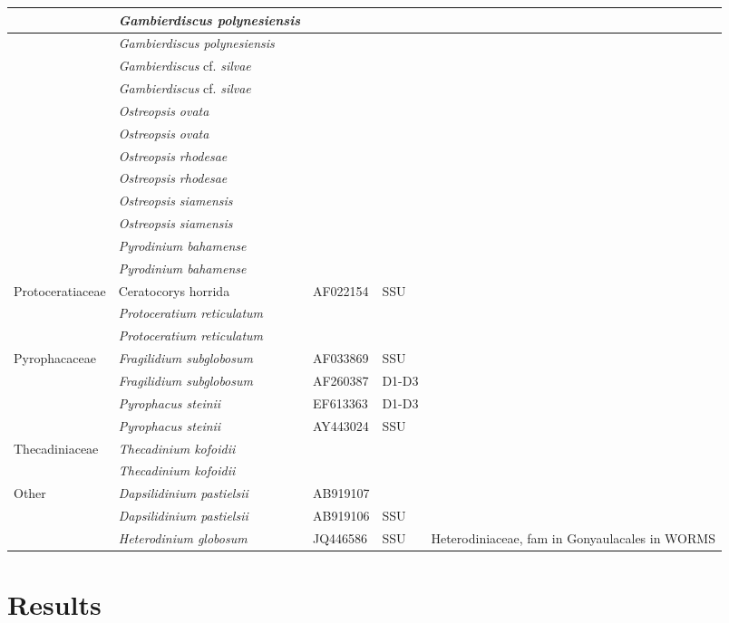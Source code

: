 \documentclass[12pt]{article}
\begin{document}
\begin{table}
\begin{tabular}{  | p{3cm} |p{4cm} | p{2cm} | p{3cm} | p{3cm}  |}
&\emph{Gambierdiscus polynesiensis}&&&\\
\hline
&\emph{Gambierdiscus polynesiensis}&&&\\
\hline
&\emph{Gambierdiscus} cf. \emph{silvae}&&&\\
\hline
&\emph{Gambierdiscus} cf. \emph{silvae}&&&\\
\hline
&\emph{Ostreopsis ovata}&&&\\
\hline
&\emph{Ostreopsis ovata}&&&\\
\hline
&\emph{Ostreopsis rhodesae}&&&\\
\hline
&\emph{Ostreopsis rhodesae}&&&\\
\hline
&\emph{Ostreopsis siamensis}&&&\\
\hline
&\emph{Ostreopsis siamensis}&&&\\
\hline
&\emph{Pyrodinium bahamense}&&&\\
\hline
&\emph{Pyrodinium bahamense}&&&\\
\hline
Protoceratiaceae&Ceratocorys horrida&AF022154&SSU&\\
\hline
&\emph{Protoceratium reticulatum}&&&\\
\hline
&\emph{Protoceratium reticulatum}&&&\\
\hline
Pyrophacaceae&\textit{Fragilidium subglobosum}&AF033869&SSU&\\
\hline
&\textit{Fragilidium subglobosum}&AF260387&D1-D3&\\
\hline
&\textit{Pyrophacus steinii}&EF613363&D1-D3&\\
\hline
&\textit{Pyrophacus steinii}&AY443024&SSU&\\
\hline
Thecadiniaceae&\emph{Thecadinium kofoidii}&&&\\
\hline
&\emph{Thecadinium kofoidii}&&&\\
\hline
Other&\textit{Dapsilidinium pastielsii}&AB919107&&\\
&\textit{Dapsilidinium pastielsii}&AB919106&SSU&\\
&\textit{Heterodinium globosum}&JQ446586&SSU&Heterodiniaceae, fam in Gonyaulacales in WORMS\\
\hline
\end{tabular}
\end{table}

\newpage
\section{Results}

\end{document}

